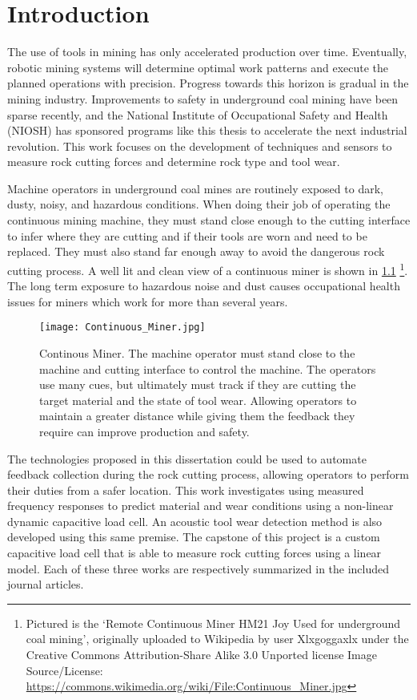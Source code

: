 \chapter{Introduction}\label{chap:1}

The use of tools in mining has only accelerated production over time.
Eventually, robotic mining systems will determine optimal work patterns 
and execute the planned operations with precision.
Progress towards this horizon is gradual in the mining industry.
Improvements to safety in underground coal mining have been sparse recently,
and the National Institute of Occupational Safety and Health (NIOSH) has sponsored
programs like this thesis to accelerate the next industrial revolution.
This work focuses on the development of techniques and sensors 
to measure rock cutting forces and determine rock type and tool wear.

Machine operators in underground coal mines are routinely exposed to dark, dusty, noisy, and
hazardous conditions. When doing their job of operating the continuous mining machine,
they must stand close enough to the cutting interface to infer where they are cutting and 
if their tools are worn and need to be replaced. They must also stand far enough away to avoid
the dangerous rock cutting process. 
A well lit and clean view of a continuous miner is shown in \ref{fig:conminer}
\footnote{Pictured is the `Remote Continuous Miner HM21 Joy Used for underground coal mining',
 originally uploaded to Wikipedia by user Xlxgoggaxlx 
 under the Creative Commons Attribution-Share Alike 3.0 Unported license
Image Source/License: \url{https://commons.wikimedia.org/wiki/File:Continuous_Miner.jpg}}.
 The long term exposure to hazardous noise and dust causes 
occupational health issues for miners which work for more than several years.

\begin{figure}[h]
\centering
\texttt{[image: Continuous\_Miner.jpg]}
\caption{Continous Miner. 
 The machine operator must stand close to the machine and cutting interface to control the machine.
The operators use many cues, but ultimately must track if they are cutting the target material and 
the state of tool wear. Allowing operators to maintain a greater distance while giving them
the feedback they require can improve production and safety.}
\label{fig:conminer}
\end{figure}

The technologies proposed in this dissertation could be used to automate feedback collection
during the rock cutting process, allowing operators to perform their duties from a safer location.
This work investigates using measured frequency responses to predict material and wear conditions
using a non-linear dynamic capacitive load cell. 
An acoustic tool wear detection method is also developed using this same premise.
The capstone of this project is a custom capacitive load cell that is able to measure 
rock cutting forces using a linear model. 
Each of these three works are respectively summarized in the included journal articles.


